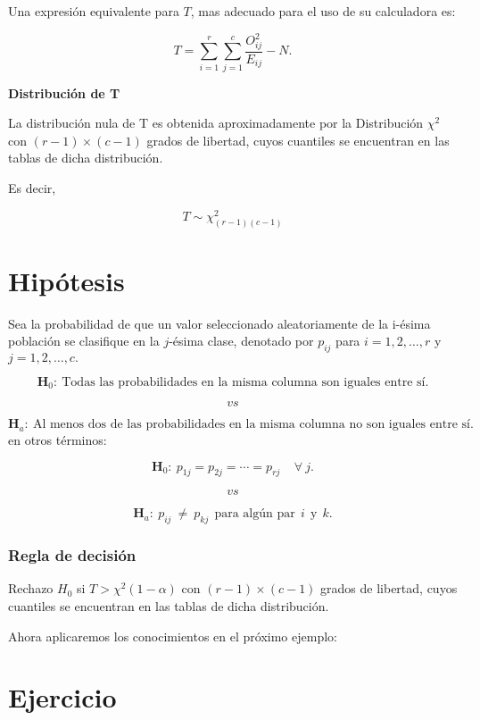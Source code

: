 \documentclass[
  a4paper,
  oneside,
  openany]{book}
\begin{document}
Una expresión equivalente para \(T\), mas adecuado para el uso de su calculadora es:

\[T=\sum_{i=1}^{r}\sum_{j=1}^{c}\frac{O_{ij}^{2}}{E_{ij}}-N.\]

\textbf{Distribución de T}

La distribución nula de T es obtenida aproximadamente por la Distribución \(\chi^2\) con \((r-1)\times(c-1)\) grados de libertad, cuyos cuantiles se encuentran en las tablas de dicha distribución.

Es decir,

\[T\sim \chi^2_{(r-1)(c-1)}\]

\hypertarget{hipuxf3tesis-10}{%
\section{Hipótesis}\label{hipuxf3tesis-10}}

Sea la probabilidad de que un valor seleccionado aleatoriamente de la i-ésima población se clasifique en la \(j\)-ésima clase, denotado por \(p_{ij}\) para \(i= 1, 2,\ldots,r\) y \(j=1,2,\ldots,c.\)

\[\textbf{H}_0: \ \mbox{Todas las probabilidades en la misma columna son iguales entre sí.}\]

\[vs\]

\[\textbf{H}_a: \ \mbox{Al menos dos de las probabilidades en la misma columna no son iguales entre sí.}\]
en otros términos:

\[\textbf{H}_0: \ p_{1j}=p_{2j}= \cdots=p_{rj} \ \ \ \ \  \forall\  j.\]

\[vs\]

\[\textbf{H}_a: \ p_{ij} \ \neq \  p_{kj} \ \ \mbox{para algún par} \ \  i \ \ \mbox{y} \ \ k.\]

\hypertarget{regla-de-decisiuxf3n-25}{%
\subsubsection*{Regla de decisión}\label{regla-de-decisiuxf3n-25}}


Rechazo \(H_0\) si \(T> \chi^2(1-\alpha)\) con \((r-1)\times(c-1)\) grados de libertad, cuyos cuantiles se encuentran en las tablas de dicha distribución.

Ahora aplicaremos los conocimientos en el próximo ejemplo:

\hypertarget{ejercicio-1}{%
\section{Ejercicio}\label{ejercicio-1}}
\end{document}
